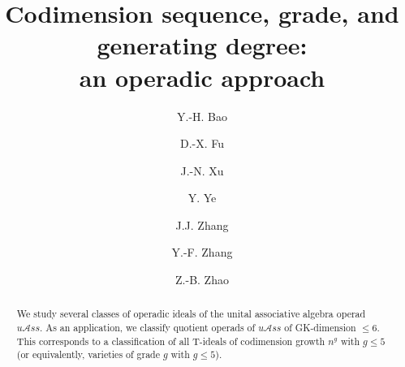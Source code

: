 \documentclass{amsart}
\theoremstyle{definition}
\theoremstyle{remark}
\numberwithin{equation}{section}
\def \uas{u\mathcal{A}ss}
\begin{document}
\title{Codimension sequence, grade, and generating degree:\\
an operadic approach}

\author{Y.-H. Bao}
\address{(Bao) School of Mathematical Sciences, Anhui University, Hefei 230601, China}

\author{D.-X. Fu}
\address{(Fu) School of Mathematics and Statistics, Suzhou University, Suzhou 234000, China}

\author{J.-N. Xu}
\address{(Xu) School of Mathematical Sciences, Anhui University, Hefei 230601, China}

\author{Y. Ye}
\address{(Ye) School of Mathematical Sciences,
	University of Science and Technology of China, Hefei 230026, China}

\author{J.J. Zhang}
\address{(Zhang) Department of Mathematics, Box 354350,
University of Washington, Seattle, Washington 98195, USA}

\author{Y.-F. Zhang}
\address{(Zhang)  School of Mathematical Sciences, Anhui University, Hefei 230601, China}

\author{Z.-B. Zhao}
\address{(Zhao) School of Mathematical Sciences, Anhui University, Hefei 230601, China}








\begin{abstract} 
We study several classes of operadic ideals of the unital associative algebra operad $\uas$. 
As an application, we classify quotient operads of $\uas$ of GK-dimension $\leq 6$.
This corresponds to a classification of all T-ideals of codimension growth $n^g$ with $g\leq 5$
 (or equivalently, varieties of grade $g$ with $g\leq 5$).
\end{abstract}
\end{document}
